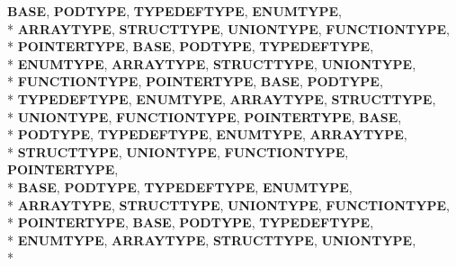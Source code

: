 \begin{DoxyCompactItemize}
{\bfseries B\-A\-S\-E}, 
{\bfseries P\-O\-D\-T\-Y\-P\-E}, 
{\bfseries T\-Y\-P\-E\-D\-E\-F\-T\-Y\-P\-E}, 
{\bfseries E\-N\-U\-M\-T\-Y\-P\-E}, 
\\*
{\bfseries A\-R\-R\-A\-Y\-T\-Y\-P\-E}, 
{\bfseries S\-T\-R\-U\-C\-T\-T\-Y\-P\-E}, 
{\bfseries U\-N\-I\-O\-N\-T\-Y\-P\-E}, 
{\bfseries F\-U\-N\-C\-T\-I\-O\-N\-T\-Y\-P\-E}, 
\\*
{\bfseries P\-O\-I\-N\-T\-E\-R\-T\-Y\-P\-E}, 
{\bfseries B\-A\-S\-E}, 
{\bfseries P\-O\-D\-T\-Y\-P\-E}, 
{\bfseries T\-Y\-P\-E\-D\-E\-F\-T\-Y\-P\-E}, 
\\*
{\bfseries E\-N\-U\-M\-T\-Y\-P\-E}, 
{\bfseries A\-R\-R\-A\-Y\-T\-Y\-P\-E}, 
{\bfseries S\-T\-R\-U\-C\-T\-T\-Y\-P\-E}, 
{\bfseries U\-N\-I\-O\-N\-T\-Y\-P\-E}, 
\\*
{\bfseries F\-U\-N\-C\-T\-I\-O\-N\-T\-Y\-P\-E}, 
{\bfseries P\-O\-I\-N\-T\-E\-R\-T\-Y\-P\-E}, 
{\bfseries B\-A\-S\-E}, 
{\bfseries P\-O\-D\-T\-Y\-P\-E}, 
\\*
{\bfseries T\-Y\-P\-E\-D\-E\-F\-T\-Y\-P\-E}, 
{\bfseries E\-N\-U\-M\-T\-Y\-P\-E}, 
{\bfseries A\-R\-R\-A\-Y\-T\-Y\-P\-E}, 
{\bfseries S\-T\-R\-U\-C\-T\-T\-Y\-P\-E}, 
\\*
{\bfseries U\-N\-I\-O\-N\-T\-Y\-P\-E}, 
{\bfseries F\-U\-N\-C\-T\-I\-O\-N\-T\-Y\-P\-E}, 
{\bfseries P\-O\-I\-N\-T\-E\-R\-T\-Y\-P\-E}, 
{\bfseries B\-A\-S\-E}, 
\\*
{\bfseries P\-O\-D\-T\-Y\-P\-E}, 
{\bfseries T\-Y\-P\-E\-D\-E\-F\-T\-Y\-P\-E}, 
{\bfseries E\-N\-U\-M\-T\-Y\-P\-E}, 
{\bfseries A\-R\-R\-A\-Y\-T\-Y\-P\-E}, 
\\*
{\bfseries S\-T\-R\-U\-C\-T\-T\-Y\-P\-E}, 
{\bfseries U\-N\-I\-O\-N\-T\-Y\-P\-E}, 
{\bfseries F\-U\-N\-C\-T\-I\-O\-N\-T\-Y\-P\-E}, 
{\bfseries P\-O\-I\-N\-T\-E\-R\-T\-Y\-P\-E}, 
\\*
{\bfseries B\-A\-S\-E}, 
{\bfseries P\-O\-D\-T\-Y\-P\-E}, 
{\bfseries T\-Y\-P\-E\-D\-E\-F\-T\-Y\-P\-E}, 
{\bfseries E\-N\-U\-M\-T\-Y\-P\-E}, 
\\*
{\bfseries A\-R\-R\-A\-Y\-T\-Y\-P\-E}, 
{\bfseries S\-T\-R\-U\-C\-T\-T\-Y\-P\-E}, 
{\bfseries U\-N\-I\-O\-N\-T\-Y\-P\-E}, 
{\bfseries F\-U\-N\-C\-T\-I\-O\-N\-T\-Y\-P\-E}, 
\\*
{\bfseries P\-O\-I\-N\-T\-E\-R\-T\-Y\-P\-E}, 
{\bfseries B\-A\-S\-E}, 
{\bfseries P\-O\-D\-T\-Y\-P\-E}, 
{\bfseries T\-Y\-P\-E\-D\-E\-F\-T\-Y\-P\-E}, 
\\*
{\bfseries E\-N\-U\-M\-T\-Y\-P\-E}, 
{\bfseries A\-R\-R\-A\-Y\-T\-Y\-P\-E}, 
{\bfseries S\-T\-R\-U\-C\-T\-T\-Y\-P\-E}, 
{\bfseries U\-N\-I\-O\-N\-T\-Y\-P\-E}, 
\\*

\end{DoxyCompactItemize}

